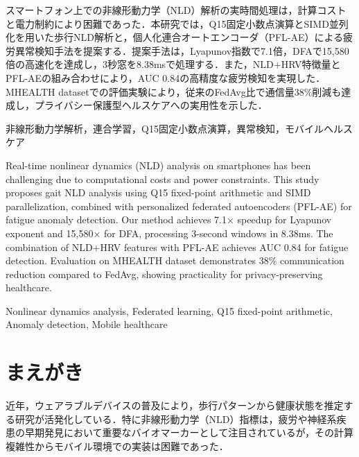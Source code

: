 \documentclass[paper]{ieice}
\begin{document}
\begin{jabstract}
スマートフォン上での非線形動力学（NLD）解析の実時間処理は，計算コストと電力制約により困難であった．本研究では，Q15固定小数点演算とSIMD並列化を用いた歩行NLD解析と，個人化連合オートエンコーダ（PFL-AE）による疲労異常検知手法を提案する．提案手法は，Lyapunov指数で7.1倍，DFAで15,580倍の高速化を達成し，3秒窓を8.38msで処理する．また，NLD+HRV特徴量とPFL-AEの組み合わせにより，AUC 0.84の高精度な疲労検知を実現した．MHEALTH datasetでの評価実験により，従来のFedAvg比で通信量38\%削減も達成し，プライバシー保護型ヘルスケアへの実用性を示した．
\end{jabstract}

\begin{jkeyword}
非線形動力学解析，連合学習，Q15固定小数点演算，異常検知，モバイルヘルスケア
\end{jkeyword}

\begin{eabstract}
Real-time nonlinear dynamics (NLD) analysis on smartphones has been challenging due to computational costs and power constraints. This study proposes gait NLD analysis using Q15 fixed-point arithmetic and SIMD parallelization, combined with personalized federated autoencoders (PFL-AE) for fatigue anomaly detection. Our method achieves 7.1× speedup for Lyapunov exponent and 15,580× for DFA, processing 3-second windows in 8.38ms. The combination of NLD+HRV features with PFL-AE achieves AUC 0.84 for fatigue detection. Evaluation on MHEALTH dataset demonstrates 38\% communication reduction compared to FedAvg, showing practicality for privacy-preserving healthcare.
\end{eabstract}

\begin{ekeyword}
Nonlinear dynamics analysis, Federated learning, Q15 fixed-point arithmetic, Anomaly detection, Mobile healthcare
\end{ekeyword}

\maketitle

\section{まえがき}

近年，ウェアラブルデバイスの普及により，歩行パターンから健康状態を推定する研究が活発化している\cite{hausdorff2009}．特に非線形動力学（NLD）指標は，疲労や神経系疾患の早期発見において重要なバイオマーカーとして注目されているが\cite{peng1995}，その計算複雑性からモバイル環境での実装は困難であった．
\end{document}
